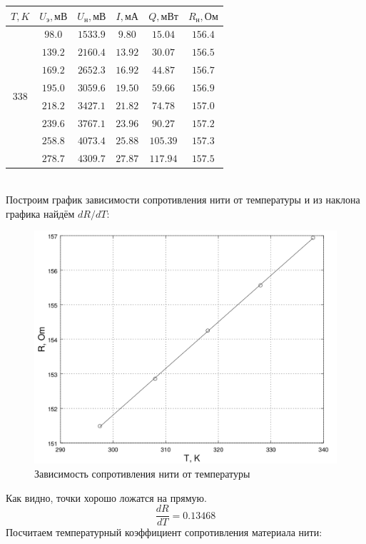 \documentclass[20pt]{article}
\begin{document}
\begin{tabular}{|c|c|c|c|c|c|}
\hline $T, K$ & $U_\text{э}, \text{мВ}$ & $U_{\text{н}}, \text{мВ}$ & $I, \text{мА}$ & $Q, \text{мВт}$ & $R_{\text{н}}, \text{Ом}$ \\\hline
\multirow{8}{*}{338}
 & $98.0$ & $1533.9$ & $9.80$ & $15.04$ & $156.4$ \\\cline{2-6}
 & $139.2$ & $2160.4$ & $13.92$ & $30.07$ & $156.5$ \\\cline{2-6}
 & $169.2$ & $2652.3$ & $16.92$ & $44.87$ & $156.7$ \\\cline{2-6}
 & $195.0$ & $3059.6$ & $19.50$ & $59.66$ & $156.9$ \\\cline{2-6}
 & $218.2$ & $3427.1$ & $21.82$ & $74.78$ & $157.0$ \\\cline{2-6}
 & $239.6$ & $3767.1$ & $23.96$ & $90.27$ & $157.2$ \\\cline{2-6}
 & $258.8$ & $4073.4$ & $25.88$ & $105.39$ & $157.3$ \\\cline{2-6}
 & $278.7$ & $4309.7$ & $27.87$ & $117.94$ & $157.5$ \\\hline
\end{tabular}\\
Построим график зависимости сопротивления нити от температуры и из наклона графика найдём $dR/dT$:
\begin{figure}[H]
	\centering
	\caption{Зависимость сопротивления нити от температуры}
	\includegraphics[scale=0.25]{rt.png}
\end{figure}
Как видно, точки хорошо ложатся на прямую.
\[
	\frac{dR}{dT} = 0.13468 
\]
Посчитаем температурный коэффициент сопротивления материала нити:
\end{document}
